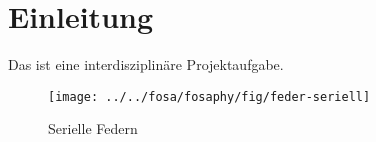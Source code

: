\documentclass[a4,paper,fleqn]{article}
\begin{document}


\tableofcontents

\newpage

\section{Einleitung}
Das ist eine interdisziplinäre Projektaufgabe. 

\begin{figure}
\centering
\texttt{[image: ../../fosa/fosaphy/fig/feder-seriell]}
\caption{Serielle Federn}
\label{fig:feder-seriell}
\end{figure}

\newpage

\listoffigures
\end{document}

